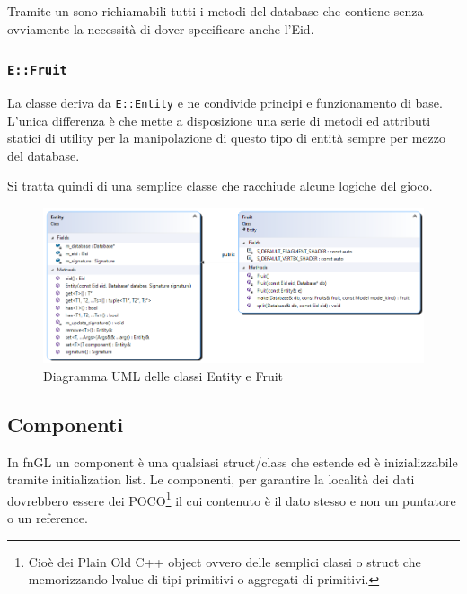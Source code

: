 Tramite un  sono richiamabili tutti i metodi del database che contiene senza ovviamente la necessità di dover specificare anche l'Eid.

\subsubsection{\texttt{E::Fruit}}
La classe  deriva da \texttt{E::Entity} e ne condivide principi e funzionamento di base. L'unica differenza è che mette a disposizione una serie di metodi ed attributi statici di utility per la manipolazione di questo tipo di entità sempre per mezzo del database.

Si tratta quindi di una semplice classe che racchiude alcune logiche del gioco.

\begin{figure}[!htp]
	\centering
	\includegraphics[width=0.95\linewidth]{images/ch20/5}
	\caption{Diagramma UML delle classi Entity e Fruit}
	\label{fig:5}
\end{figure}



\subsection{Componenti}
In fnGL un component è una qualsiasi struct/class che estende   ed è inizializzabile tramite initialization list. Le componenti, per garantire la località dei dati dovrebbero essere dei POCO\footnote{Cioè dei 
Plain Old C++ object ovvero delle semplici classi o struct che memorizzando lvalue di tipi primitivi o aggregati di primitivi.} il cui contenuto è il dato stesso e non un puntatore o un reference. 

